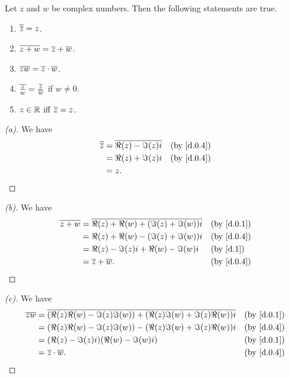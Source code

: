 \begin{thm}\label{d.2}
  Let \(z\) and \(w\) be complex numbers.
  Then the following statements are true.
  \begin{enumerate}
    \item \(\overline{\overline{z}} = z\).
    \item \(\overline{z + w} = \overline{z} + \overline{w}\).
    \item \(\overline{zw} = \overline{z} \cdot \overline{w}\).
    \item \(\overline{\frac{z}{w}} = \frac{\overline{z}}{\overline{w}}\) if \(w \neq 0\).
    \item \(z \in \mathbb{R}\) iff \(\overline{z} = z\).
  \end{enumerate}
\end{thm}

\begin{proof}[(a)]
  We have
  \begin{align*}
    \conj{\conj{z}} & = \conj{\Re(z) - \Im(z) i} &  & \text{(by \cref{d.0.4})} \\
                    & = \Re(z) + \Im(z) i        &  & \text{(by \cref{d.0.4})} \\
                    & = z.
  \end{align*}
\end{proof}

\begin{proof}[(b)]
  We have
  \begin{align*}
    \conj{z + w} & = \conj{\Re(z) + \Re(w) + (\Im(z) + \Im(w)) i} &  & \text{(by \cref{d.0.1})} \\
                 & = \Re(z) + \Re(w) - (\Im(z) + \Im(w)) i        &  & \text{(by \cref{d.0.4})} \\
                 & = \Re(z) - \Im(z) i + \Re(w) - \Im(w) i        &  & \text{(by \cref{d.1})}   \\
                 & = \conj{z} + \conj{w}.                         &  & \text{(by \cref{d.0.4})}
  \end{align*}
\end{proof}

\begin{proof}[(c)]
  We have
  \begin{align*}
    \conj{zw} & = \conj{(\Re(z) \Re(w) - \Im(z) \Im(w)) + (\Re(z) \Im(w) + \Im(z) \Re(w)) i} &  & \text{(by \cref{d.0.1})} \\
              & = (\Re(z) \Re(w) - \Im(z) \Im(w)) - (\Re(z) \Im(w) + \Im(z) \Re(w)) i        &  & \text{(by \cref{d.0.4})} \\
              & = (\Re(z) - \Im(z) i) (\Re(w) - \Im(w) i)                                    &  & \text{(by \cref{d.0.1})} \\
              & = \conj{z} \cdot \conj{w}.                                                   &  & \text{(by \cref{d.0.4})}
  \end{align*}
\end{proof}

